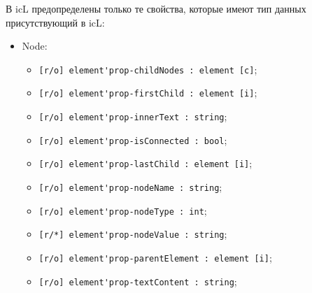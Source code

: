 \documentclass[a4paper, 14pt]{extarticle}
\newenvironment{icItems}
	{ \begin{itemize} [noitemsep,nolistsep] }
	{ \end{itemize} }
\begin{document}
В icL предопределены только те свойства, которые имеют тип данных присутствующий в icL:
\begin{icItems}
	\item Node:	
	\begin{icItems}
		\item \lstinline|[r/o] element'prop-childNodes : element [c]|;
		\item \lstinline|[r/o] element'prop-firstChild : element [i]|;
		\item \lstinline|[r/o] element'prop-innerText : string|;
		\item \lstinline|[r/o] element'prop-isConnected : bool|;
		\item \lstinline|[r/o] element'prop-lastChild : element [i]|;
		\item \lstinline|[r/o] element'prop-nodeName : string|;
		\item \lstinline|[r/o] element'prop-nodeType : int|;
		\item \lstinline|[r/*] element'prop-nodeValue : string|;
		\item \lstinline|[r/o] element'prop-parentElement : element [i]|;
		\item \lstinline|[r/o] element'prop-textContent : string|;
	\end{icItems}
	

\end{icItems}
\end{document}
